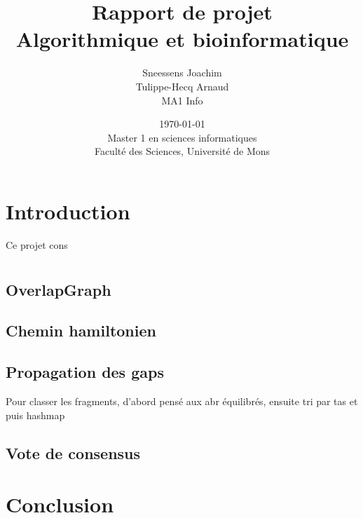 \documentclass{article}
\title{
{\Huge Rapport de projet}\\
Algorithmique et bioinformatique}
\author{Sneessens Joachim\\Tulippe-Hecq Arnaud\\MA1 Info}
\date{\today\\
Master 1 en sciences informatiques\\
\vspace{1cm}
Faculté des Sciences, Université de Mons}
\begin{document}
\maketitle

\newpage

\section{Introduction}

Ce projet cons

\section{}


\subsection{OverlapGraph}

\subsection{Chemin hamiltonien}

\subsection{Propagation des gaps}

Pour classer les fragments, d'abord pensé aux abr équilibrés, ensuite tri par tas et puis hashmap

\subsection{Vote de consensus}

\section{Conclusion}
\end{document}
